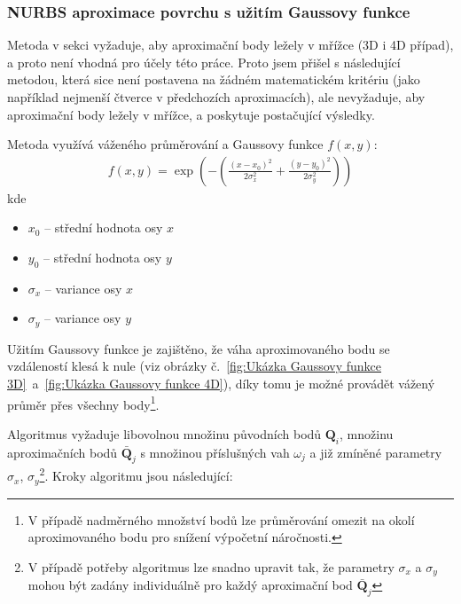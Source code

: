 \subsubsection{NURBS aproximace povrchu s užitím Gaussovy funkce}\label{section: gauss surface approximation 3D}
Metoda v sekci  vyžaduje, aby aproximační
body ležely v mřížce (3D i 4D případ), a proto není vhodná pro účely této
práce. Proto jsem přišel s následující metodou, která sice není postavena na
žádném matematickém kritériu (jako například nejmenší čtverce v předchozích
aproximacích), ale nevyžaduje, aby aproximační body ležely v mřížce, a poskytuje
postačující výsledky. \par Metoda využívá váženého průměrování a Gaussovy
funkce $f(x, y)$:
\begin{align}
    f(x,y) = \exp\left(-\left(\frac{(x - x_0)^2}{2\sigma_x^2} + \frac{(y - y_0)^2}{2\sigma_y^2}\right)\right)
\end{align}
kde
\begin{itemize}
    \item $x_0$ -- střední hodnota osy $x$
    \item $y_0$ -- střední hodnota osy $y$
    \item $\sigma_x$ -- variance osy $x$
    \item $\sigma_y$ -- variance osy $y$
\end{itemize}
Užitím Gaussovy funkce je zajištěno, že váha aproximovaného bodu se vzdáleností klesá k nule
(viz obrázky č.~\ref{fig:Ukázka Gaussovy funkce 3D}~a~\ref{fig:Ukázka Gaussovy funkce 4D}),
díky tomu je možné provádět vážený průměr přes všechny body\footnote{V případě nadměrného množství bodů lze průměrování omezit na okolí aproximovaného bodu pro snížení výpočetní náročnosti.}.\par
Algoritmus vyžaduje libovolnou množinu původních bodů $\bm{Q}_i$, množinu
aproximačních bodů $\bar{\bm{Q}}_j$ s množinou příslušných vah $\omega_j$ a již
zmíněné parametry $\sigma_x$, $\sigma_y$\footnote{V případě potřeby algoritmus lze snadno
    upravit tak, že parametry $\sigma_x$ a $\sigma_y$ mohou být zadány individuálně
    pro každý aproximační bod $\bar{\bm{Q}}_j$}. Kroky algoritmu jsou následující:
